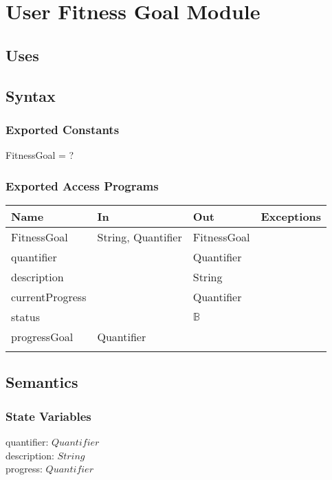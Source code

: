 \documentclass[12pt, titlepage]{article}
\begin{document}
\section{User Fitness Goal Module}

\subsection{Uses}

\subsection{Syntax}

\subsubsection{Exported Constants}
FitnessGoal = ?
\subsubsection{Exported Access Programs}

\begin{center}
	\begin{tabular}{p{2cm} p{4cm} p{4cm} p{2cm}}
		\hline
		\textbf{Name} & \textbf{In} & \textbf{Out} & \textbf{Exceptions} \\
		\hline
		FitnessGoal & String, Quantifier & FitnessGoal &  \\
		quantifier &  & Quantifier &  \\
		description &  & String &  \\
		currentProgress &  & Quantifier &  \\
		status &  & $\mathbb{B}$ &  \\
		progressGoal & Quantifier &  &  \\
		&  &  &  \\
		\hline
	\end{tabular}
\end{center}

\subsection{Semantics}

\subsubsection{State Variables}
quantifier: $Quantifier$ \\
description: $String$ \\
progress: $Quantifier$ \\
\end{document}
